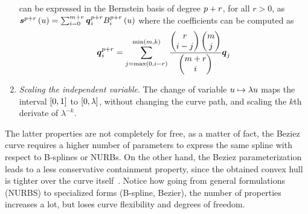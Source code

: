 \begin{enumerate}
    can be expressed in the Bernstein basis of degree $p + r$, for all $r > 0$, as $\boldsymbol{s}^{p + r} \left( u \right) =
    \sum_{i = 0}^{m+r} \boldsymbol{q}_i^{p+r} B_{i}^{p+r} \left( u \right)$ where the coefficients can be computed as
    \begin{equation*}
        \boldsymbol{q}_i^{p+r} = \sum_{j = \max \left( 0, i-r \right) }^{\min \left(  m, k \right)} \frac{
            \begin{pmatrix}
                r \\ i-j
            \end{pmatrix}
            \begin{pmatrix}
                m \\ j
            \end{pmatrix}
        }{
            \begin{pmatrix}
                m+r \\ i
            \end{pmatrix}
        } \boldsymbol{q}_j
    \end{equation*}
    \item \emph{Scaling the independent variable}. The change of variable $u \mapsto \lambda u$ maps the interval
    $\left[ 0, 1 \right]$ to $\left[ 0, \lambda \right]$, without changing the curve path, and scaling the $k$th derivate of $\lambda^{-k}$.
\end{enumerate}
The latter properties are not completely for free, as a matter of fact, the B\acuteacc eziez curve requires a higher number of parameters to
express the same spline with respect to B-splines or NURBs. On the other hand, the B\acuteacc eziez parameterization leads to a less conservative
containment property, since the obtained convex hull is tighter over the curve itself~\cite*{tordesillas2020minvo}.
Notice how going from general formulations (NURBS) to specialized forms (B-spline, B\acuteacc ezier), the number of properties increases
a lot, but loses curve flexibility and degrees of freedom.

